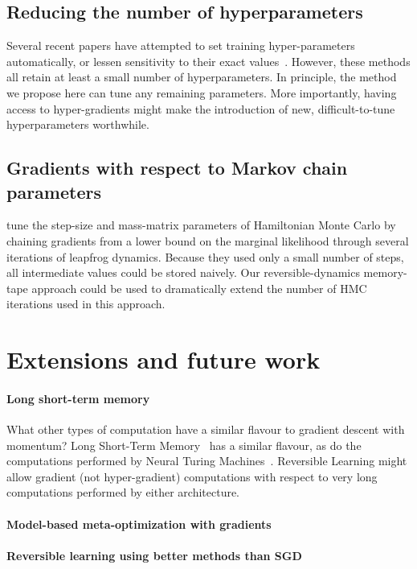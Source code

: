\documentclass{article}
\begin{document}
\subsection{Reducing the number of hyperparameters}
Several recent papers have attempted to set training hyper-parameters automatically, or lessen sensitivity to their exact values~\cite{schaul2012no, Adam14, Adasecant14, Hotswap14}.
However, these methods all retain at least a small number of hyperparameters.
In principle, the method we propose here can tune any remaining parameters.
More importantly, having access to hyper-gradients might make the introduction of new, difficult-to-tune hyperparameters worthwhile.

\subsection{Gradients with respect to Markov chain parameters}
\citet{Bridging14} tune the step-size and mass-matrix parameters of Hamiltonian Monte Carlo by chaining gradients from a lower bound on the marginal likelihood through several iterations of leapfrog dynamics.
Because they used only a small number of steps, all intermediate values could be stored naively.
Our reversible-dynamics memory-tape approach could be used to dramatically extend the number of HMC iterations used in this approach.

\section{Extensions and future work}

\paragraph{Long short-term memory}
What other types of computation have a similar flavour to gradient descent with momentum?
Long Short-Term Memory~\citep{hochreiter1997long} has a similar flavour, as do the computations performed by Neural Turing Machines~\citep{graves2014neural}.
Reversible Learning might allow gradient (not hyper-gradient) computations with respect to very long computations performed by either architecture.

\paragraph{Model-based meta-optimization with gradients}

\paragraph{Reversible learning using better methods than SGD}
\end{document}
